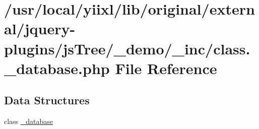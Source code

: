 \hypertarget{class_8__database_8php}{
\section{/usr/local/yiixl/lib/original/external/jquery-\/plugins/jsTree/\_\-demo/\_\-inc/class.\_\-database.php File Reference}
\label{class_8__database_8php}
}
\subsection*{Data Structures}
\begin{DoxyCompactItemize}
\item 
class \hyperlink{class__database}{\_\-database}
\end{DoxyCompactItemize}
